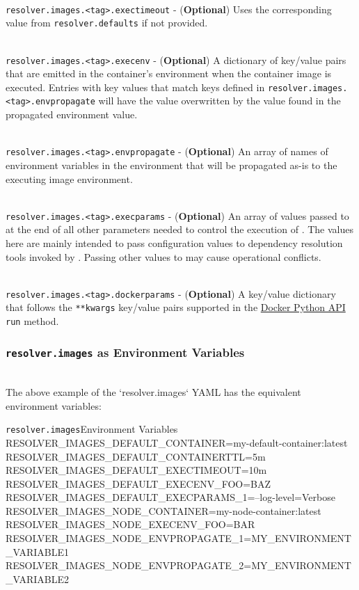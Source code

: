 \noindent\\\texttt{resolver.images.<tag>.exectimeout} - (\textbf{Optional})  Uses the corresponding 
value from \texttt{resolver.defaults} if not provided.

\noindent\\\texttt{resolver.images.<tag>.execenv} - (\textbf{Optional}) A dictionary of key/value 
pairs that are emitted in the container's environment when the container image is executed.  
Entries with key values that match keys defined in \texttt{resolver.images.<tag>.envpropagate} 
will have the value overwritten by the value found in the propagated environment value.

\noindent\\\texttt{resolver.images.<tag>.envpropagate} - (\textbf{Optional}) An array of names of 
environment variables in the \cxflowplusplus environment that will be propagated as-is to the 
executing image environment.

\noindent\\\texttt{resolver.images.<tag>.execparams} - (\textbf{Optional}) An array of values passed
to \scaresolver at the end of all other parameters needed to control the
execution of \scaresolver.  The values here are mainly intended to pass configuration
values to dependency resolution tools invoked by \scaresolver.  Passing other values
to \scaresolver may cause operational conflicts.

\noindent\\\texttt{resolver.images.<tag>.dockerparams} - (\textbf{Optional}) A key/value dictionary 
that follows the \texttt{**kwargs} key/value pairs supported in the 
\href{https://docker-py.readthedocs.io/en/stable/containers.html#docker.models.containers.ContainerCollection.run}{Docker Python API} 
\texttt{run} method.

\subsubsection{\texttt{resolver.images} as Environment Variables}

\noindent\\The above example of the `resolver.images` YAML has the equivalent environment variables:\\

\begin{code}{\texttt{resolver.images}}{Environment Variables}{}
RESOLVER_IMAGES_DEFAULT_CONTAINER=my-default-container:latest
RESOLVER_IMAGES_DEFAULT_CONTAINERTTL=5m
RESOLVER_IMAGES_DEFAULT_EXECTIMEOUT=10m
RESOLVER_IMAGES_DEFAULT_EXECENV_FOO=BAZ
RESOLVER_IMAGES_DEFAULT_EXECPARAMS_1=--log-level=Verbose
RESOLVER_IMAGES_NODE_CONTAINER=my-node-container:latest
RESOLVER_IMAGES_NODE_EXECENV_FOO=BAR
RESOLVER_IMAGES_NODE_ENVPROPAGATE_1=MY_ENVIRONMENT_VARIABLE1
RESOLVER_IMAGES_NODE_ENVPROPAGATE_2=MY_ENVIRONMENT_VARIABLE2
\end{code}